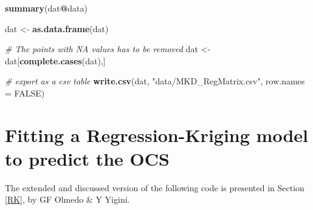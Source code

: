 \documentclass[10pt,b5paper,]{book}
\newenvironment{Shaded}{\begin{snugshade}}{\end{snugshade}}
\newcommand{\CommentTok}[1]{\textcolor[rgb]{0.56,0.35,0.01}{\textit{#1}}}
\newcommand{\DataTypeTok}[1]{\textcolor[rgb]{0.13,0.29,0.53}{#1}}
\newcommand{\KeywordTok}[1]{\textcolor[rgb]{0.13,0.29,0.53}{\textbf{#1}}}
\newcommand{\NormalTok}[1]{#1}
\newcommand{\OperatorTok}[1]{\textcolor[rgb]{0.81,0.36,0.00}{\textbf{#1}}}
\newcommand{\OtherTok}[1]{\textcolor[rgb]{0.56,0.35,0.01}{#1}}
\newcommand{\StringTok}[1]{\textcolor[rgb]{0.31,0.60,0.02}{#1}}
\theoremstyle{definition}
\theoremstyle{definition}
\theoremstyle{definition}
\theoremstyle{remark}
\begin{document}
\begin{Shaded}
\begin{Highlighting}[]
\KeywordTok{summary}\NormalTok{(dat}\OperatorTok{@}\NormalTok{data)}

\NormalTok{dat <-}\StringTok{ }\KeywordTok{as.data.frame}\NormalTok{(dat)}

\CommentTok{# The points with NA values has to be removed }
\NormalTok{dat <-}\StringTok{ }\NormalTok{dat[}\KeywordTok{complete.cases}\NormalTok{(dat),]}

\CommentTok{# export as a csv table}
\KeywordTok{write.csv}\NormalTok{(dat, }\StringTok{"data/MKD_RegMatrix.csv"}\NormalTok{, }\DataTypeTok{row.names =} \OtherTok{FALSE}\NormalTok{)}
\end{Highlighting}
\end{Shaded}

\clearpage

\hypertarget{cd:RK}{%
\section{Fitting a Regression-Kriging model to predict the
OCS}\label{cd:RK}}

The extended and discussed version of the following code is presented in
Section \ref{RK}, by GF Olmedo \& Y Yigini.
\end{document}
